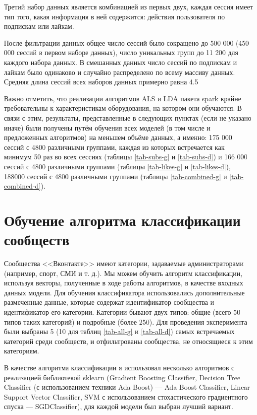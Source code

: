 \documentclass[times,specification,annotation]{itmo-student-thesis}
\begin{document}
Третий набор данных является комбинацией из первых двух, каждая сессия имеет тип того, какая информация в ней содержится: действия пользователя по подпискам или лайкам. 

После фильтрации данных общее число сессий было сокращено до 500 000 (450 000 сессий в первом наборе данных), число уникальных групп до 11 200 для каждого набора данных. В смешанных данных число сессий по подпискам и лайкам было одинаково и случайно распределено по всему массиву данных. Средняя длина сессий всех наборов данных примерно равна 4.5

Важно отметить, что реализации алгоритмов ALS и LDA пакета spark крайне требовательны к характеристикам оборудования, на котором они обучаются. В связи с этим, результаты, представленные в следующих пунктах (если не указано иначе) были получены путём обучения всех моделей (в том числе и предложенных алгоритмов) на меньшем объёме данных, а именно: 175 000 сессий с 4800 различными группами, каждая из которых встречается как минимум 50 раз во всех сессиях (таблицы  \ref{tab-subs-g} и \ref{tab-subs-d}) и 166 000 сессий с 4800 различными группами (таблицы \ref{tab-likes-g} и \ref{tab-likes-d}), 188000 сессий с 4800 различными группами (таблицы \ref{tab-combined-g} и \ref{tab-combined-d}). 

\section{Обучение алгоритма классификации сообществ}\label{sec:class}

Сообщества <<Вконтакте>> имеют категории, задаваемые администраторами
(например, спорт, СМИ и т. д.). Мы можем обучить алгоритм классификации,
используя векторы, полученные в ходе работы алгоритмов, в качестве входных
данных модели.  Для обучения классификатора использовались дополнительные размеченные данные, которые содержат идентификатор сообщества и идентификатор его категории. Категории бывают двух типов: общие (всего 50 типов таких категорий) и подробные (более 250). Для проведения эксперимента были выбраны 5 (10 для таблиц  \ref{tab-all-g} и  \ref{tab-all-d}) самых встречаемых категорий среди сообществ, и отфильтрованы сообщества, не относящиеся к этим категориям.

В качестве алгоритма классификации я использовал несколько алгоритмов с реализацией библиотекой sklearn (Gradient Boosting Classifier, Decision Tree Classifier (с использованием техники Ada Boost) --- Ada Boost Classifier, Linear Support Vector Classifier, SVM с использованием стохастического градиентного спуска --- SGDClassifier), для каждой модели был выбран лучший вариант. 
\end{document}
